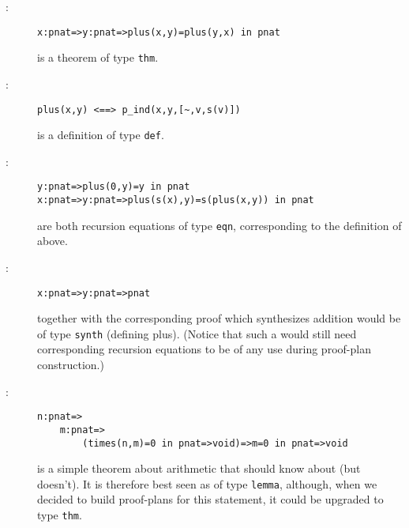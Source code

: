 \begin{description}
\item[{\tt {}}:]
\begin{verbatim}
x:pnat=>y:pnat=>plus(x,y)=plus(y,x) in pnat
\end{verbatim}
is a theorem of type {\tt thm}.

\item[{\tt {}}:]
\begin{verbatim}
plus(x,y) <==> p_ind(x,y,[~,v,s(v)])
\end{verbatim}
is a definition of type {\tt def}.

\item[{\tt {}}:]
\begin{verbatim}
y:pnat=>plus(0,y)=y in pnat
x:pnat=>y:pnat=>plus(s(x),y)=s(plus(x,y)) in pnat
\end{verbatim}
are both recursion equations of type {\tt eqn}, corresponding to the
definition of  above.


\item[{\tt {}}:]
\begin{verbatim}
x:pnat=>y:pnat=>pnat
\end{verbatim}
together with the corresponding proof which
synthesizes addition would be of type {\tt synth} (defining plus).
(Notice that such a 
 would still need corresponding recursion
equations to be of any use during proof-plan construction.)
\item[{\tt {}}:]
\begin{verbatim}
n:pnat=>
    m:pnat=>
        (times(n,m)=0 in pnat=>void)=>m=0 in pnat=>void
\end{verbatim}
is a simple theorem about arithmetic that \oyster should know about
(but doesn't). It is therefore best seen as of type {\tt lemma}, although,
when we decided to build proof-plans for this statement, it could be
upgraded to type {\tt thm}.


\end{description}
